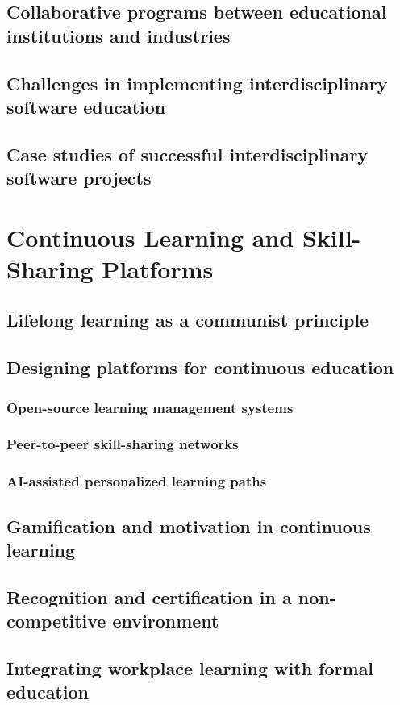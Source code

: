 \subsection{Collaborative programs between educational institutions and industries}
\subsection{Challenges in implementing interdisciplinary software education}
\subsection{Case studies of successful interdisciplinary software projects}

\newpage

\section{Continuous Learning and Skill-Sharing Platforms}
\subsection{Lifelong learning as a communist principle}
\subsection{Designing platforms for continuous education}
\subsubsection{Open-source learning management systems}
\subsubsection{Peer-to-peer skill-sharing networks}
\subsubsection{AI-assisted personalized learning paths}
\subsection{Gamification and motivation in continuous learning}
\subsection{Recognition and certification in a non-competitive environment}
\subsection{Integrating workplace learning with formal education}
